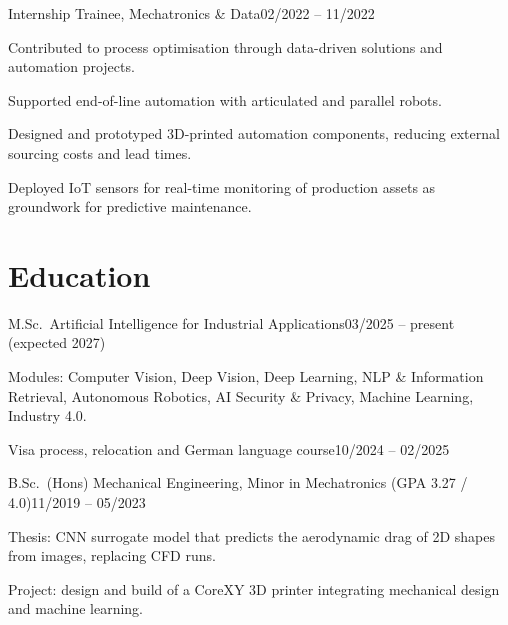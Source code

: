 \documentclass[a4paper,10pt]{article}
\begin{document}
          {Internship Trainee, Mechatronics \& Data}{02/2022 -- 11/2022}
  \cvpointsstart
    \item Contributed to process optimisation through data-driven solutions and automation projects.
    \item Supported end-of-line automation with articulated and parallel robots.
    \item Designed and prototyped 3D-printed automation components, reducing external sourcing costs and lead times.
    \item Deployed IoT sensors for real-time monitoring of production assets as groundwork for predictive maintenance.
  \cvpointsend

\cvlistend

\section{Education}
\cvliststart

          {M.Sc.\ Artificial Intelligence for Industrial Applications}{03/2025 -- present (expected 2027)}
  \cvpointsstart
    \item Modules: Computer Vision, Deep Vision, Deep Learning, NLP \& Information Retrieval, Autonomous Robotics,
          AI Security \& Privacy, Machine Learning, Industry 4.0.
  \cvpointsend

          {Visa process, relocation and German language course}{10/2024 -- 02/2025}

          {B.Sc.\ (Hons) Mechanical Engineering, Minor in Mechatronics \textup{(GPA 3.27 / 4.0)}}{11/2019 -- 05/2023}
  \cvpointsstart
    \item Thesis: CNN surrogate model that predicts the aerodynamic drag of 2D shapes from images, replacing CFD runs.
    \item Project: design and build of a CoreXY 3D printer integrating mechanical design and machine learning.
  \cvpointsend

\cvlistend

\end{document}
